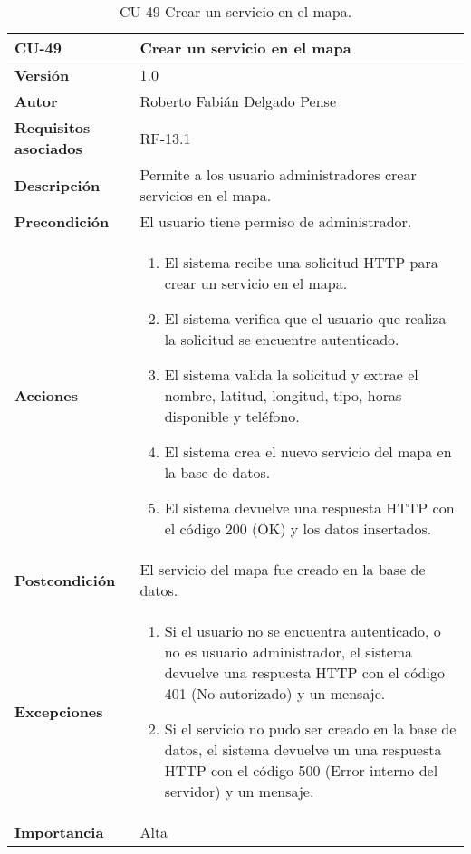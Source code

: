 \begin{table}[p]
	\centering
	\begin{tabularx}{\linewidth}{ p{} p{} }
		\toprule
		\textbf{CU-49}    & \textbf{Crear un servicio en el mapa}\\
		\toprule
		\textbf{Versión}              & 1.0    \\
		\textbf{Autor}                & Roberto Fabián Delgado Pense \\
		\textbf{Requisitos asociados} & RF-13.1 \\ 
		\textbf{Descripción}          & Permite a los usuario administradores crear servicios en el mapa. \\
		\textbf{Precondición}         & El usuario tiene permiso de administrador. \\  
		\textbf{Acciones}             &
		\begin{enumerate}
			\def\labelenumi{\arabic{enumi}.}
			\tightlist
			\item El sistema recibe una solicitud HTTP para crear un servicio en el mapa.
                \item El sistema verifica que el usuario que realiza la solicitud se encuentre autenticado.
                \item El sistema valida la solicitud y extrae el nombre, latitud, longitud, tipo, horas disponible y teléfono.
                \item El sistema crea el nuevo servicio del mapa en la base de datos.
                \item El sistema devuelve una respuesta HTTP con el código 200 (OK) y los datos insertados.         
            \end{enumerate}\\
		\textbf{Postcondición}        & El servicio del mapa fue creado en la base de datos. \\
		\textbf{Excepciones}          & 
              \begin{enumerate}
			\def\labelenumi{\arabic{enumi}.}
			\tightlist
   			\item Si el usuario no se encuentra autenticado, o no es usuario administrador, el sistema devuelve una                 respuesta HTTP con el código 401 (No autorizado) y un mensaje.
                \item   Si el servicio no pudo ser creado en la base de datos, el sistema devuelve un                           una respuesta HTTP con el código 500 (Error interno del servidor) y un mensaje. 
            \end{enumerate}\\
		\textbf{Importancia}          & Alta \\
		\bottomrule
	\end{tabularx}
	\caption{CU-49 Crear un servicio en el mapa.}
\end{table}


